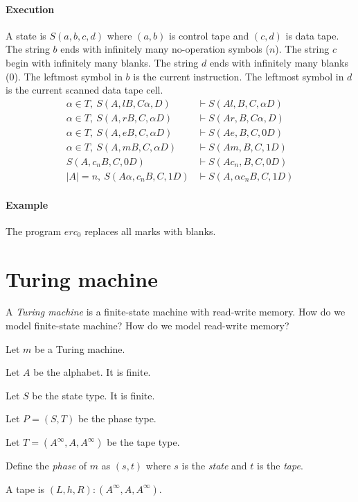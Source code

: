 \paragraph{Execution}
A state is \(S(a,b,c,d)\) where \((a,b)\) is control tape and \((c,d)\) is data tape.
The string \(b\) ends with infinitely many no-operation symbols (\(n\)).
The string \(c\) begin with infinitely many blanks.
The string \(d\) ends with infinitely many blanks (\(0\)).
The leftmost symbol in \(b\) is the current instruction.
The leftmost symbol in \(d\) is the current scanned data tape cell.
\begin{align*}
    \alpha \in T, ~ S(A,l B,C \alpha,D) &\vdash S(A l,B,C,\alpha D)
    \\
    \alpha \in T, ~ S(A,r B,C,\alpha D) &\vdash S(A r,B,C \alpha,D)
    \\
    \alpha \in T, ~ S(A,e B,C,\alpha D) &\vdash S(A e,B,C,0 D)
    \\
    \alpha \in T, ~ S(A,m B,C,\alpha D) &\vdash S(A m,B,C,1 D)
    \\
    S(A,c_n B,C,0 D) &\vdash S(A c_n,B,C,0 D)
    \\
    |A| = n, ~ S(A \alpha, c_n B, C, 1 D) &\vdash S(A, \alpha c_n B, C, 1 D)
\end{align*}

\paragraph{Example}
The program \(e r c_0\) replaces all marks with blanks.

\section{Turing machine}

A \emph{Turing machine} is a finite-state machine with read-write memory.
How do we model finite-state machine?
How do we model read-write memory?

Let \(m\) be a Turing machine.

Let \(A\) be the alphabet.
It is finite.

Let \(S\) be the state type.
It is finite.

Let \(P = (S,T)\) be the phase type.

Let \(T = (A^\infty,A,A^\infty)\) be the tape type.

Define the \emph{phase} of \(m\) as \((s,t)\)
where \(s\) is the \emph{state} and \(t\) is the \emph{tape}.

A tape is \((L,h,R) : (A^\infty,A,A^\infty)\).

